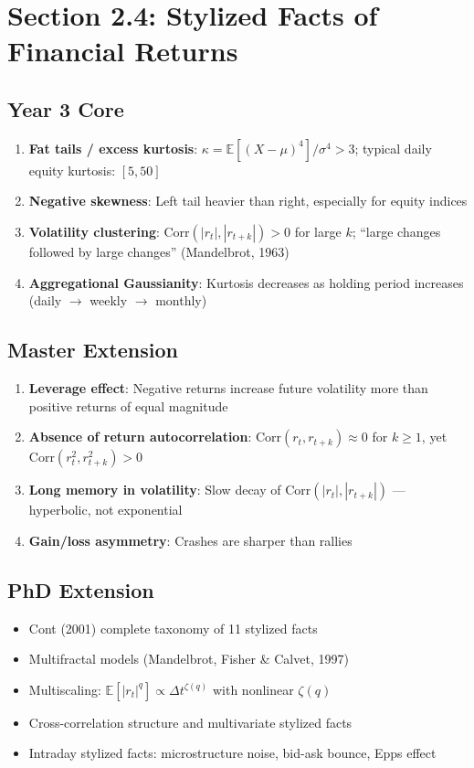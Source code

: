 \documentclass[11pt, a4paper]{article}
\newcommand{\E}{\mathbb{E}}
\newcommand{\Corr}{\text{Corr}}
\theoremstyle{definition}
\begin{document}
\section{Section 2.4: Stylized Facts of Financial Returns}

\subsection{Year 3 Core}
\begin{enumerate}
  \item \textbf{Fat tails / excess kurtosis}: $\kappa = \E[(X-\mu)^4]/\sigma^4 > 3$; typical daily equity kurtosis: $[5, 50]$
  \item \textbf{Negative skewness}: Left tail heavier than right, especially for equity indices
  \item \textbf{Volatility clustering}: $\Corr(|r_t|, |r_{t+k}|) > 0$ for large $k$; ``large changes followed by large changes'' (Mandelbrot, 1963)
  \item \textbf{Aggregational Gaussianity}: Kurtosis decreases as holding period increases (daily $\to$ weekly $\to$ monthly)
\end{enumerate}

\subsection{Master Extension}
\begin{enumerate}[resume]
  \item \textbf{Leverage effect}: Negative returns increase future volatility more than positive returns of equal magnitude
  \item \textbf{Absence of return autocorrelation}: $\Corr(r_t, r_{t+k}) \approx 0$ for $k \geq 1$, yet $\Corr(r_t^2, r_{t+k}^2) > 0$
  \item \textbf{Long memory in volatility}: Slow decay of $\Corr(|r_t|, |r_{t+k}|)$ — hyperbolic, not exponential
  \item \textbf{Gain/loss asymmetry}: Crashes are sharper than rallies
\end{enumerate}

\subsection{PhD Extension}
\begin{itemize}
  \item Cont (2001) complete taxonomy of 11 stylized facts
  \item Multifractal models (Mandelbrot, Fisher \& Calvet, 1997)
  \item Multiscaling: $\E[|r_t|^q] \propto \Delta t^{\zeta(q)}$ with nonlinear $\zeta(q)$
  \item Cross-correlation structure and multivariate stylized facts
  \item Intraday stylized facts: microstructure noise, bid-ask bounce, Epps effect
\end{itemize}
\end{document}
